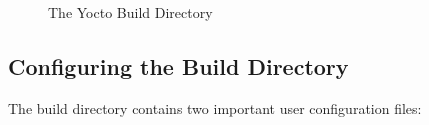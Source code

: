 \vspace{0.5cm}
\begin{figure}[H]
%
\caption{The Yocto Build Directory}
\label{fig:yoctobuilddir}
\end{figure}
\vspace{0.5cm}

\subsection{Configuring the Build Directory}

The build directory contains two important user configuration files:

